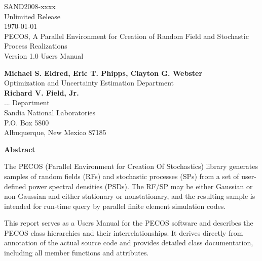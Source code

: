 \documentclass[letterpaper]{book}
\begin{document}
\begin{titlepage}
\setcounter{page}{3}
\begin{center}
{\large SAND2008-xxxx}\\
{\large Unlimited Release}\\
{\large \today}\\

\vspace*{1.5cm}
{\LARGE PECOS, A Parallel Environment for Creation of Random Field and
Stochastic Process Realizations}\\
\vspace*{1cm}
{\LARGE Version 1.0 Users Manual}\\
\vspace*{1cm}

{\large \bf Michael S. Eldred, Eric T. Phipps, Clayton G. Webster}\\
{\large Optimization and Uncertainty Estimation Department}\\
\vspace*{0.5cm}
{\large \bf Richard V. Field, Jr.}\\
{\large ... Department}\\
\vspace*{0.5cm}
{\large Sandia National Laboratories}\\
{\large P.O. Box 5800}\\
{\large Albuquerque, New Mexico 87185}\\
\vspace*{1cm}

{\Large \bf Abstract}
\end{center}

The PECOS (Parallel Environment for Creation Of Stochastics) library
generates samples of random fields (RFs) and stochastic processes
(SPs) from a set of user-defined power spectral densities (PSDs).  The
RF/SP may be either Gaussian or non-Gaussian and either stationary or
nonstationary, and the resulting sample is intended for run-time query
by parallel finite element simulation codes.

This report serves as a Users Manual for the PECOS software and
describes the PECOS class hierarchies and their interrelationships.
It derives directly from annotation of the actual source code and
provides detailed class documentation, including all member functions
and attributes.

\end{titlepage}

\cleardoublepage
\tableofcontents
\cleardoublepage
\end{document}
